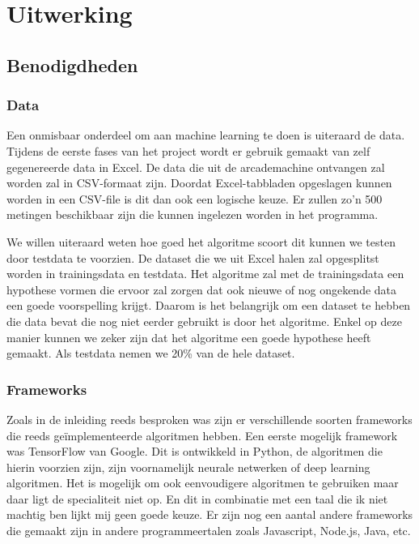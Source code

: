 
\chapter{Uitwerking}
\label{ch:uitwerking}


\section{Benodigdheden}
\label{sec:Benodigdheden}

\subsection{Data}
Een onmisbaar onderdeel om aan machine learning te doen is uiteraard de data. Tijdens de eerste fases van het project wordt er gebruik gemaakt van zelf gegenereerde data in Excel. De data die uit de arcademachine ontvangen zal worden zal in CSV-formaat zijn. Doordat Excel-tabbladen opgeslagen kunnen worden in een CSV-file is dit dan ook een logische keuze. 
Er zullen zo'n 500 metingen beschikbaar zijn die kunnen ingelezen worden in het programma. 

We willen uiteraard weten hoe goed het algoritme scoort dit kunnen we testen door testdata te voorzien. De dataset die we uit Excel halen zal opgesplitst worden in trainingsdata en testdata. Het algoritme zal met de trainingsdata een hypothese vormen die ervoor zal zorgen dat ook nieuwe of nog ongekende data een goede voorspelling krijgt. Daarom is het belangrijk om een dataset te hebben die data bevat die nog niet eerder gebruikt is door het algoritme. Enkel op deze manier kunnen we zeker zijn dat het algoritme een goede hypothese heeft gemaakt. Als testdata nemen we 20\% van de hele dataset. 

\subsection{Frameworks}
Zoals in de inleiding reeds besproken was zijn er verschillende soorten frameworks die reeds geïmplementeerde algoritmen hebben. Een eerste mogelijk framework was TensorFlow van Google. Dit is ontwikkeld in Python, de algoritmen die hierin voorzien zijn, zijn voornamelijk neurale netwerken of deep learning algoritmen. Het is mogelijk om ook eenvoudigere algoritmen te gebruiken maar daar ligt de specialiteit niet op. En dit in combinatie met een taal die ik niet machtig ben lijkt mij geen goede keuze. Er zijn nog een aantal andere frameworks die gemaakt zijn in andere programmeertalen zoals Javascript, Node.js, Java, etc. 

